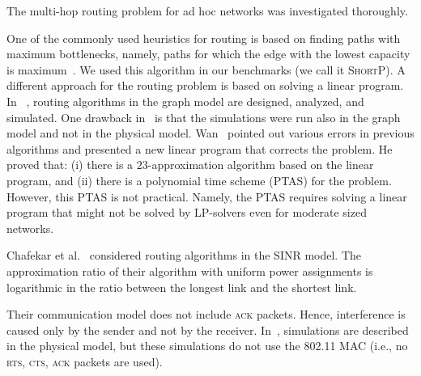 \documentclass[11pt]{article}
\newenvironment{proof sketch}[1]{\noindent {\emph{Proof sketch of #1:}}}{\hfill \qed}
\newcommand{\algB}{\textsc{ShortP}}
\newcommand{\algS}{\algB}
\begin{document}
The multi-hop routing problem for ad hoc networks was investigated
thoroughly.

One of the commonly used heuristics for routing is based on finding
paths with maximum bottlenecks, namely, paths for which the edge with
the lowest capacity is maximum~\cite{draves2004routing}.  We used this
algorithm in our benchmarks (we call it \algS). A different approach
for the routing problem is based on solving a linear program.  In
~\cite{kumar2005algorithmic,jain2005impact,alicherry2005joint11},
routing algorithms in the graph model are designed, analyzed, and
simulated.  One drawback
in~\cite{kumar2005algorithmic,jain2005impact,alicherry2005joint11} is
that the simulations were run also in the graph model and not in the
physical model.  Wan~\cite{wan2009multiflows} pointed out various
errors in previous algorithms and presented a new linear program that
corrects the problem. He proved that: (i) there is a
$23$-approximation algorithm based on the linear program, and (ii)
there is a polynomial time scheme (PTAS) for the problem. However,
this PTAS is not practical.  Namely, the PTAS requires solving a
linear program that might not be solved by LP-solvers even for
moderate sized networks.

Chafekar et al.~\cite{ChafekarCapacity,chafekarPhD} considered routing
algorithms in the SINR model. The approximation ratio of their
algorithm with uniform power assignments is logarithmic in the ratio
between the longest link and the shortest link.

Their communication model does not include \textsc{ack} packets.
Hence, interference is caused only by the sender and not by the
receiver.  In~\cite{chafekarPhD}, simulations are described in the
physical model, but these simulations do not use the 802.11 MAC (i.e.,
no \textsc{rts, cts, ack} packets are used).
\end{document}
